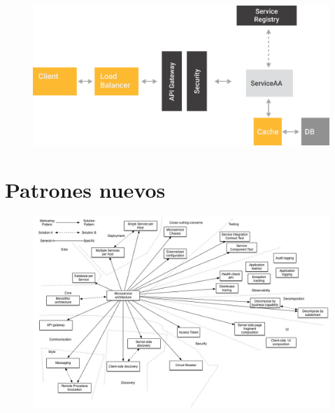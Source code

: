 \documentclass[aspectratio=169]{beamer}
\begin{document}
\begin{frame}{}

\begin{figure}
	\centering
	\includegraphics[width=0.7\linewidth]{Images/microservicios.png}
\end{figure}
\end{frame}


{
	\section{Patrones nuevos}
}



\begin{frame}{}
	\begin{figure}
		\centering
		\includegraphics[width=\linewidth]{Images/PatternsRelatedToMicroservices}
	\end{figure}
\end{frame}
\end{document}

